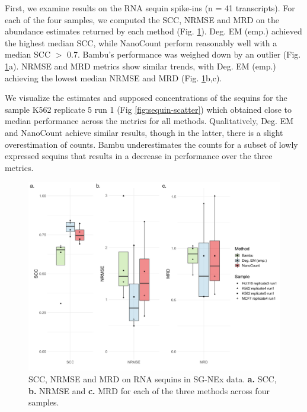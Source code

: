 First, we examine results on the RNA sequin spike-ins (n = 41 transcripts). For each of the four samples, we computed the SCC, NRMSE and MRD on the abundance estimates returned by each method (Fig. \ref{fig:sequin-metrics}). Deg. EM (emp.) achieved the highest median SCC, while NanoCount perform reasonably well with a median SCC $>$ 0.7. Bambu's performance was weighed down by an outlier (Fig. \ref{fig:sequin-metrics}a). NRMSE and MRD metrics show similar trends, with Deg. EM (emp.) achieving the lowest median NRMSE and MRD (Fig. \ref{fig:sequin-metrics}b,c).

We visualize the estimates and supposed concentrations of the sequins for the sample K562 replicate 5 run 1 (Fig \ref{fig:sequin-scatter}) which obtained close to median performance across the metrics for all methods. Qualitatively, Deg. EM and NanoCount achieve similar results, though in the latter, there is a slight overestimation of counts. Bambu underestimates the counts for a subset of lowly expressed sequins that results in a decrease in performance over the three metrics.  

\begin{figure}[H]
    \centering
    \includegraphics[width=\textwidth]{figures/sequin-metrics.png}
    \caption[SCC, NRMSE and MRD on RNA sequins in SG-NEx data]{SCC, NRMSE and MRD on RNA sequins in SG-NEx data. \textbf{a.} SCC, \textbf{b.} NRMSE and \textbf{c.} MRD for each of the three methods across four samples.}
    \label{fig:sequin-metrics}
\end{figure}

